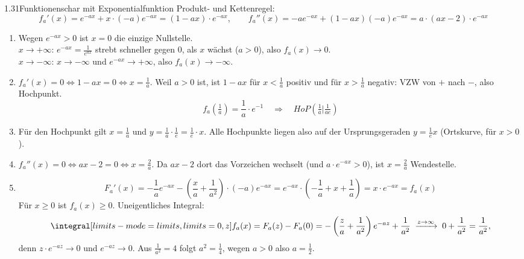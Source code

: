 \begin{loesung}{1.31}{Funktionenschar mit Exponentialfunktion}
Produkt- und Kettenregel:
\[f_a'(x) = e^{-ax}+x\cdot(-a)e^{-ax} = (1-ax)\cdot e^{-ax},\qquad f_a''(x) = -ae^{-ax}+(1-ax)(-a)e^{-ax} = a\cdot(ax-2)\cdot e^{-ax}\]
\begin{enumerate}[label=\alph*)]
  \item Wegen $e^{-ax}>0$ ist $x=0$ die einzige Nullstelle.\\
  $x\longrightarrow+\infty$: $e^{-ax} = \frac{1}{e^{ax}}$ strebt schneller gegen $0$, als $x$ wächst ($a>0$), also $f_a(x)\longrightarrow 0$.\\
  $x\longrightarrow-\infty$: $x\longrightarrow-\infty$ und $e^{-ax}\longrightarrow+\infty$, also $f_a(x)\longrightarrow-\infty$.
  \item $f_a'(x)=0\Longleftrightarrow 1-ax=0\Longleftrightarrow x=\frac{1}{a}$. Weil $a>0$ ist, ist $1-ax$ für $x<\frac{1}{a}$ positiv und für $x>\frac{1}{a}$ negativ: VZW von $+$ nach $-$, also Hochpunkt.
  \[f_a\left(\tfrac{1}{a}\right) = \dfrac{1}{a}\cdot e^{-1}\quad\Longrightarrow\quad HoP\left(\tfrac{1}{a}\Big|\tfrac{1}{ae}\right)\]
  \item Für den Hochpunkt gilt $x=\frac{1}{a}$ und $y=\frac{1}{a}\cdot\frac{1}{e} = \frac{1}{e}\cdot x$. Alle Hochpunkte liegen also auf der Ursprungsgeraden $y=\frac{1}{e}x$ (Ortskurve, für $x>0$).
  \item $f_a''(x)=0\Longleftrightarrow ax-2=0\Longleftrightarrow x=\frac{2}{a}$. Da $ax-2$ dort das Vorzeichen wechselt (und $a\cdot e^{-ax}>0$), ist $x=\frac{2}{a}$ Wendestelle.
  \item \[F_a'(x) = -\dfrac{1}{a}e^{-ax}-\left(\dfrac{x}{a}+\dfrac{1}{a^2}\right)\cdot(-a)e^{-ax} = e^{-ax}\cdot\left(-\dfrac{1}{a}+x+\dfrac{1}{a}\right) = x\cdot e^{-ax} = f_a(x)\]
  Für $x\geq 0$ ist $f_a(x)\geq 0$. Uneigentliches Integral:
  \[\integral[limits-mode=limits,limits={0, z}]{f_a(x)} = F_a(z)-F_a(0) = -\left(\dfrac{z}{a}+\dfrac{1}{a^2}\right)e^{-az}+\dfrac{1}{a^2}\;\xrightarrow{z\to\infty}\;0+\dfrac{1}{a^2} = \dfrac{1}{a^2},\]
  denn $z\cdot e^{-az}\longrightarrow 0$ und $e^{-az}\longrightarrow 0$. Aus $\frac{1}{a^2} = 4$ folgt $a^2 = \frac{1}{4}$, wegen $a>0$ also $a = \frac{1}{2}$.
\end{enumerate}
\end{loesung}

